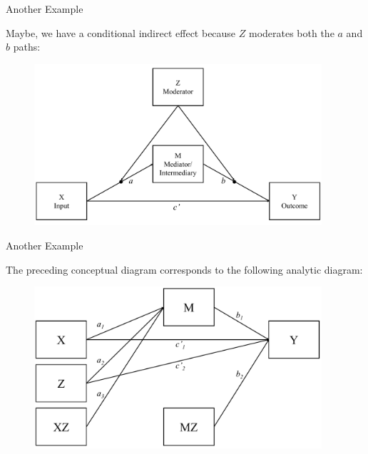 \documentclass{beamer}
\newcommand{\vb}[0]{\vspace{6pt}}
\begin{document}
\begin{frame}{Another Example}
  
  Maybe, we have a conditional indirect effect because $Z$ moderates
  both the $a$ and $b$ paths: 
  \vb
  \begin{figure}
    \includegraphics[width=0.95\textwidth]{figures/modABwithZConceptual.pdf}
  \end{figure}
  
\end{frame}



\begin{frame}{Another Example}
  
  The preceding conceptual diagram corresponds to the following
  analytic diagram: 
  \vb
  \begin{figure}
    \includegraphics[width=0.95\textwidth]{figures/modABwithZAnalytic.pdf}
  \end{figure}
  
\end{frame}
\end{document}
